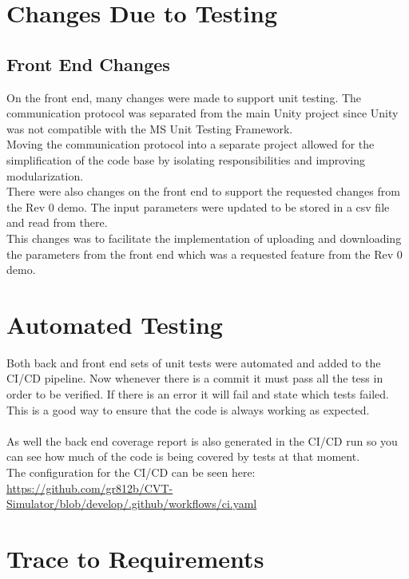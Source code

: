\documentclass[12pt, titlepage]{article}
\begin{document}
\section{Changes Due to Testing}


\subsection{Front End Changes}
On the front end, many changes were made to support unit testing. The communication protocol was separated from the main Unity project since Unity was not compatible with the MS Unit Testing Framework.
\\
Moving the communication protocol into a separate project allowed for the simplification of the code base by isolating responsibilities and improving modularization.
\\
There were also changes on the front end to support the requested changes from the Rev 0 demo. The input parameters were updated to be stored in a csv file and read from there.
\\
This changes was to facilitate the implementation of uploading and downloading the parameters from the front end which was a requested feature from the Rev 0 demo.

\section{Automated Testing}
Both back and front end sets of unit tests were automated and added to the CI/CD pipeline. Now whenever there is a commit it must pass all the tess in order to be verified.
If there is an error it will fail and state which tests failed. This is a good way to ensure that the code is always working as expected.\\
\\
As well the back end coverage report is also generated in the CI/CD run so you can see how much of the code is being covered by tests at that moment.
\\
The configuration for the CI/CD can be seen here: \url{https://github.com/gr812b/CVT-Simulator/blob/develop/.github/workflows/ci.yaml}
\section{Trace to Requirements}
		
\end{document}
